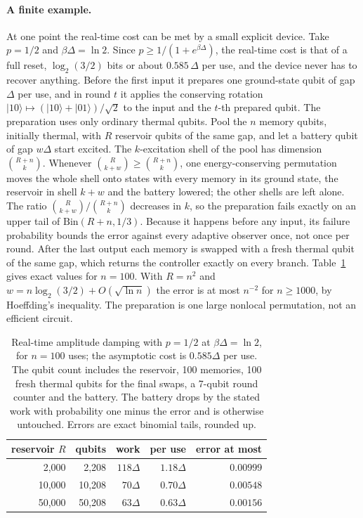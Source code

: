 \paragraph{A finite example.} At one point the real-time cost can be met by a small explicit device. Take $p=1/2$ and $\beta\Delta=\ln2$. Since $p\ge1/(1+e^{\beta\Delta})$, the real-time cost is that of a full reset, $\log_2(3/2)$ bits or about $0.585\,\Delta$ per use, and the device never has to recover anything. Before the first input it prepares one ground-state qubit of gap $\Delta$ per use, and in round $t$ it applies the conserving rotation $|10\rangle\mapsto(|10\rangle+|01\rangle)/\sqrt2$ to the input and the $t$-th prepared qubit. The preparation uses only ordinary thermal qubits. Pool the $n$ memory qubits, initially thermal, with $R$ reservoir qubits of the same gap, and let a battery qubit of gap $w\Delta$ start excited. The $k$-excitation shell of the pool has dimension $\binom{R+n}{k}$. Whenever $\binom{R}{k+w}\ge\binom{R+n}{k}$, one energy-conserving permutation moves the whole shell onto states with every memory in its ground state, the reservoir in shell $k+w$ and the battery lowered; the other shells are left alone. The ratio $\binom{R}{k+w}/\binom{R+n}{k}$ decreases in $k$, so the preparation fails exactly on an upper tail of $\mathrm{Bin}(R+n,1/3)$. Because it happens before any input, its failure probability bounds the error against every adaptive observer once, not once per round. After the last output each memory is swapped with a fresh thermal qubit of the same gap, which returns the controller exactly on every branch. Table~\ref{sw:tab:finite} gives exact values for $n=100$. With $R=n^2$ and $w=n\log_2(3/2)+O(\sqrt{\ln n})$ the error is at most $n^{-2}$ for $n\ge1000$, by Hoeffding's inequality. The preparation is one large nonlocal permutation, not an efficient circuit.

\begin{table}[t]
\centering
\begin{tabular}{rrrrr}
reservoir $R$ & qubits & work & per use & error at most\\\hline
2{,}000  & 2{,}208  & $118\Delta$ & $1.18\Delta$ & $0.00999$\\
10{,}000 & 10{,}208 & $70\Delta$  & $0.70\Delta$ & $0.00548$\\
50{,}000 & 50{,}208 & $63\Delta$  & $0.63\Delta$ & $0.00156$
\end{tabular}
\caption{Real-time amplitude damping with $p=1/2$ at $\beta\Delta=\ln2$, for $n=100$ uses; the asymptotic cost is $0.585\Delta$ per use. The qubit count includes the reservoir, 100 memories, 100 fresh thermal qubits for the final swaps, a 7-qubit round counter and the battery. The battery drops by the stated work with probability one minus the error and is otherwise untouched. Errors are exact binomial tails, rounded up.}
\label{sw:tab:finite}
\end{table}

